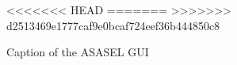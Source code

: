 	
	\begin{figure}
   \begin{center}
<<<<<<< HEAD
=======
>>>>>>> d2513469e1777caf9e0bcaf724eef36b444850c8
   \end{center}
   \caption{Caption of the ASASEL GUI}
   \label{fig:asaselGUI}
\end{figure}

